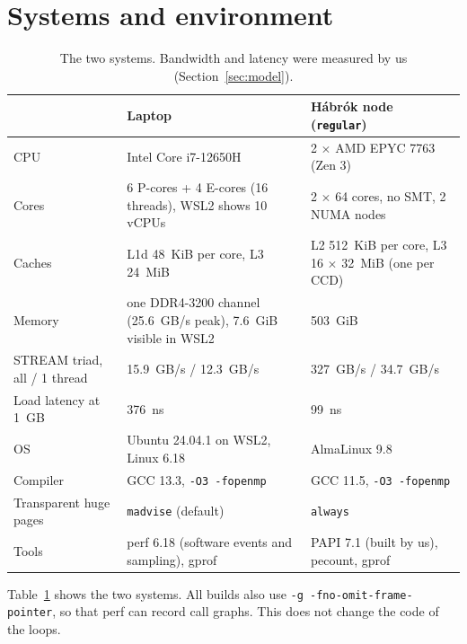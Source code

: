 \section{Systems and environment}
\label{sec:systems}

\begin{table}[ht]
\centering\footnotesize
\caption{The two systems. Bandwidth and latency were measured by us (Section~\ref{sec:model}).}
\label{tab:systems}
\begin{tabular}{@{}p{3.3cm}p{5.7cm}p{5.4cm}@{}}
\toprule
 & Laptop & Hábrók node (\texttt{regular}) \\
\midrule
CPU & Intel Core i7-12650H & 2 $\times$ AMD EPYC 7763 (Zen 3) \\
Cores & 6 P-cores + 4 E-cores (16 threads), WSL2 shows 10 vCPUs & 2 $\times$ 64 cores, no SMT, 2 NUMA nodes \\
Caches & L1d \SI{48}{KiB} per core, L3 \SI{24}{MiB} & L2 \SI{512}{KiB} per core, L3 16 $\times$ \SI{32}{MiB} (one per CCD) \\
Memory & one DDR4-3200 channel (\SI{25.6}{GB/s} peak), \SI{7.6}{GiB} visible in WSL2 & \SI{503}{GiB} \\
STREAM triad, all / 1 thread & \SI{15.9}{GB/s} / \SI{12.3}{GB/s} & \SI{327}{GB/s} / \SI{34.7}{GB/s} \\
Load latency at \SI{1}{GB} & \SI{376}{ns} & \SI{99}{ns} \\
OS & Ubuntu 24.04.1 on WSL2, Linux 6.18 & AlmaLinux 9.8 \\
Compiler & GCC 13.3, \texttt{-O3 -fopenmp} & GCC 11.5, \texttt{-O3 -fopenmp} \\
Transparent huge pages & \texttt{madvise} (default) & \texttt{always} \\
Tools & perf 6.18 (software events and sampling), gprof & PAPI 7.1 (built by us), pecount, gprof \\
\bottomrule
\end{tabular}
\end{table}

Table~\ref{tab:systems} shows the two systems. All builds also use \texttt{-g
-fno-omit-frame-pointer}, so that perf can record call graphs. This does not change the code
of the loops.

